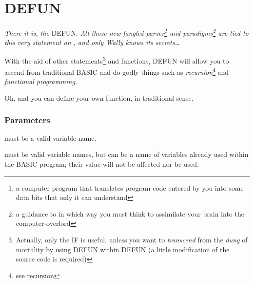 \section{DEFUN}

\emph{There it is, the} DEFUN. \emph{All those new-fangled parser\footnote{a computer program that translates program code entered by you into some data bits that only it can understand} and paradigms\footnote{a guidance to in which way you must think to assimilate your brain into the computer-overlord} are tied to this very statement on \tbas{}, and only Wally knows its secrets\ldots}


With the aid of other statements\footnote{Actually, only the IF is useful, unless you want to \emph{transcend} from the \emph{dung} of mortality by using DEFUN within DEFUN (a little modification of the source code is required)} and functions, DEFUN will allow you to ascend from traditional BASIC and do godly things such as \emph{recursion}\footnote{see recursion} and \emph{functional programming}.

Oh, and you can define your own function, in traditional  sense.

\subsubsection*{Parameters}

\begin{itemlist}
\item {} must be a valid variable name.
\item {} must be valid variable names, but can be a name of variables already used within the BASIC program; their value will not be affected nor be used.
\end{itemlist}
